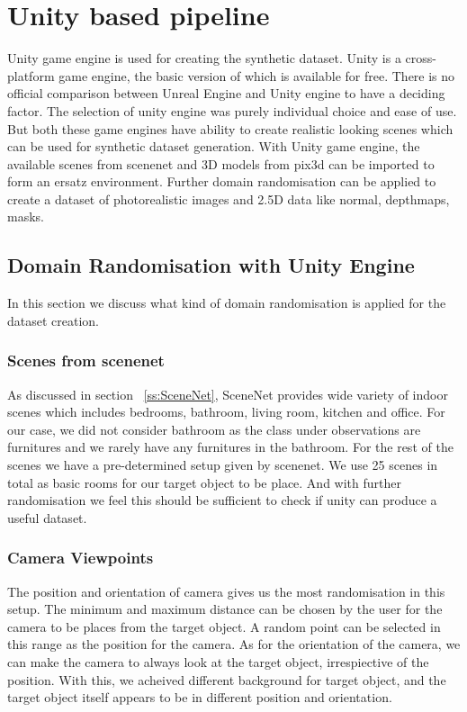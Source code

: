 \section{Unity based pipeline}\label{ss:Unity Pipeline}
Unity game engine is used for creating the synthetic dataset.
Unity is a cross-platform game engine, the basic version of which is available for free.
There is no official comparison between Unreal Engine and Unity engine to have a deciding factor.
The selection of unity engine was purely individual choice and ease of use.
But both these game engines have ability to create realistic looking scenes which can be used for synthetic dataset generation.
With Unity game engine, the available scenes from scenenet and 3D models from pix3d can be imported to form an ersatz environment.
Further domain randomisation can be applied to create a dataset of photorealistic images and 2.5D data like normal, depthmaps, masks.

\subsection{Domain Randomisation with Unity Engine}\label{ss:Domain Randomisation with unity engine}
In this section we discuss what kind of domain randomisation is applied for the dataset creation.
\subsubsection{Scenes from scenenet}
As discussed in section ~\ref{ss:SceneNet}, SceneNet provides wide variety of indoor scenes which includes bedrooms, bathroom, living room, kitchen and office.
For our case, we did not consider bathroom as the class under observations are furnitures and we rarely have any furnitures in the bathroom.
For the rest of the scenes we have a pre-determined setup given by scenenet. We use 25 scenes in total as basic rooms for our target object to be place.
And with further randomisation we feel this should be sufficient to check if unity can produce a useful dataset.

\subsubsection{Camera Viewpoints}
The position and orientation of camera gives us the most randomisation in this setup.
The minimum and maximum distance can be chosen by the user for the camera to be places from the target object.
A random point can be selected in this range as the position for the camera.
As for the orientation of the camera, we can make the camera to always look at the target object, irrespiective of the position.
With this, we acheived different background for target object, and the target object itself appears to be in different position and orientation.

